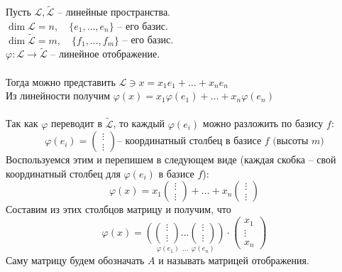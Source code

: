 \documentclass[11pt]{article}
\begin{document}
\begin{definition}
  Пусть $\mathcal{L}, \widetilde{\mathcal{L}}$ -- линейные пространства. \\
  $\dim \mathcal{L} = n, \quad \{e_1, \dots, e_n\}$ -- его базис. \\
  $\dim \widetilde{\mathcal{L}} = m, \quad \{f_1, \dots, f_m\}$ -- его базис. \\
  $\varphi \colon \mathcal{L} \to \widetilde{\mathcal{L}}$ -- линейное отображение. \\ \\
  Тогда можно представить $\mathcal{L} \ni x = x_1e_1 + \dots + x_ne_n$ \\
  Из линейности получим $\varphi (x) = x_1 \varphi (e_1) + \dots + x_n \varphi (e_n)$ \\ \\
  Так как $\varphi$ переводит в $\widetilde{\mathcal{L}}$, то каждый $\varphi (e_i)$ можно разложить по базису $f$:
  \[\varphi(e_i) = 
  \begin{pmatrix}
  \vdots \\
  \vdots  
  \end{pmatrix} 
  \text{-- координатный столбец в базисе } f \text{ (высоты $m$)}\]
  Воспользуемся этим и перепишем в следующем виде (каждая скобка -- свой координатный столбец для $\varphi (e_i)$ в базисе $f$):
  \[\varphi (x) = x_1 
  \begin{pmatrix}
  \vdots \\
  \vdots  
  \end{pmatrix}
  + \dots + x_n 
  \begin{pmatrix}
  \vdots \\
  \vdots  
  \end{pmatrix}\]
  Составим из этих столбцов матрицу и получим, что 
  \[\varphi (x) = \underset{\ \varphi(e_1) \ \ \dots \ \ \varphi(e_n)}{
    \left( 
      \begin{pmatrix}
      \vdots \\
      \vdots  
      \end{pmatrix}
      \dots
      \begin{pmatrix}
      \vdots \\
      \vdots  
      \end{pmatrix}  
    \right)}
  \cdot 
  \begin{pmatrix}
  x_1 \\
  \vdots \\
  x_n  
  \end{pmatrix}
  \]
  Саму матрицу будем обозначать $A$ и называть матрицей отображения.
\end{definition}
\end{document}
